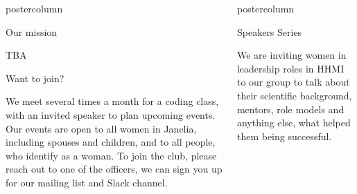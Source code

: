 \documentclass{beamer}
\newlength{\columnheight}
\begin{document}
\begin{frame}
\begin{columns}
\begin{column}{.33\textwidth}
\begin{beamercolorbox}[center,wd=\textwidth]{postercolumn}
\begin{minipage}[T]{.95\textwidth}
{\begin{myblock}{Our mission}
\begin{addmargin}[1em]{1em}
                        \end{addmargin}
                    \end{myblock}
                    \vspace{1.25cm}
                    \begin{myblock}{TBA}
                        \begin{addmargin}[1em]{1em}
                        \end{addmargin}
                    \end{myblock}
                    \vspace{1.25cm}
                    \begin{myblock}{Want to join?}
                        \begin{addmargin}[1em]{1em}
                            We meet several times a month for a coding class, with an invited speaker to plan upcoming events. Our events are open to all women in Janelia, including spouses and children, and to all people, who identify as a woman.\newline
                            To join the club, please reach out to one of the officers, we can sign you up for our mailing list and Slack channel.
                        \end{addmargin}
                    \end{myblock}
                }
		    \end{minipage}\end{beamercolorbox}
  \end{column}
	\begin{column}{.33\textwidth}
		\begin{beamercolorbox}[center,wd=\textwidth]{postercolumn}
			\begin{minipage}[T]{.95\textwidth}
				\parbox[t][\columnheight]{\textwidth}{
					\begin{myblock}{Speakers Series}
            \begin{addmargin}[1em]{1em}
                We are inviting women in leadership roles in HHMI to our group to talk about their scientific background, mentors, role models and anything else, what helped them being successful.
            \end{addmargin}
            \begin{addmargin}[1em]{1em}
                \vspace{1.5cm}
                \begin{figure}

\end{figure}
\end{addmargin}
\end{myblock}}
\end{minipage}
\end{beamercolorbox}
\end{column}
\end{columns}
\end{frame}
\end{document}
